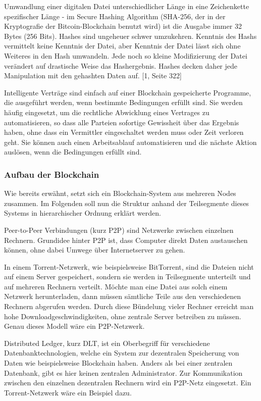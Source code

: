 Umwandlung einer digitalen Datei unterschiedlicher Länge in
eine Zeichenkette spezifischer Länge - im Secure Hashing Algorithm
(SHA-256, der in der Kryptografie der Bitcoin-Blockchain benutzt wird)
ist die Ausgabe immer 32 Bytes (256 Bits). Hashes sind ungeheuer schwer
umzukehren. Kenntnis des Hashs vermittelt keine Kenntnis der Datei,
aber Kenntnis der Datei lässt sich ohne Weiteres in den Hash umwandeln.
Jede noch so kleine Modifizierung der Datei verändert auf drastische Weise das Hashergebnis.
Hashes decken daher jede Manipulation mit den gehashten Daten auf. [1, Seite 322]

Intelligente Verträge sind einfach auf einer Blockchain gespeicherte Programme, die ausgeführt werden, wenn bestimmte Bedingungen erfüllt sind.
Sie werden häufig eingesetzt, um die rechtliche Abwicklung eines Vertrages zu automatisieren, so dass alle Parteien sofortige Gewissheit über das Ergebnis haben, ohne dass ein Vermittler eingeschaltet werden muss oder Zeit verloren geht.
Sie können auch einen Arbeitsablauf automatisieren und die nächste Aktion auslösen, wenn die Bedingungen erfüllt sind.

\subsubsection{Aufbau der Blockchain}
Wie bereits erwähnt, setzt sich ein Blockchain-System aus mehreren Nodes zusammen.
Im Folgenden soll nun die Struktur anhand der Teilsegmente dieses Systems in hierarchischer Ordnung erklärt werden.

Peer-to-Peer Verbindungen (kurz P2P) sind Netzwerke zwischen einzelnen Rechnern. Grundidee hinter P2P ist, dass Computer direkt Daten austauschen können, ohne dabei Umwege über Internetserver zu gehen.

In einem Torrent-Netzwerk, wie beispielsweise BitTorrent, sind die Dateien nicht auf einem Server gespeichert, sondern sie werden in Teilsegmente unterteilt und auf mehreren Rechnern verteilt.
Möchte man eine Datei aus solch einem Netzwerk herunterladen, dann müssen sämtliche Teile aus den verschiedenen Rechnern abgerufen werden.
Durch diese Bündelung vieler Rechner erreicht man hohe Downloadgeschwindigkeiten, ohne zentrale Server betreiben zu müssen.
Genau dieses Modell wäre ein P2P-Netzwerk.

Distributed Ledger, kurz DLT, ist ein Oberbegriff für verschiedene Datenbanktechnologien, welche ein System zur dezentralen Speicherung von Daten wie beispielsweise Blockchain haben.
Anders als bei einer zentralen Datenbank, gibt es hier keinen zentralen Administrator.
Zur Kommunikation zwischen den einzelnen dezentralen Rechnern wird ein P2P-Netz eingesetzt.
Ein Torrent-Netzwerk wäre ein Beispiel dazu.

